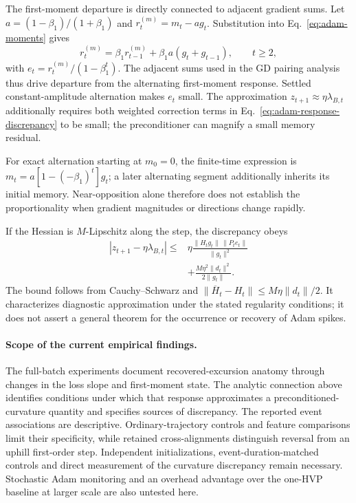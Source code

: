 The first-moment departure is directly connected to adjacent gradient
sums. Let $a=(1-\beta_1)/(1+\beta_1)$ and $r_t^{(m)}=m_t-ag_t$. Substitution
into Eq.~\eqref{eq:adam-moments} gives
\begin{equation}
r_t^{(m)}=\beta_1r_{t-1}^{(m)}+\beta_1a(g_t+g_{t-1}),
\qquad t\ge2,
\label{eq:adam-memory-residual}
\end{equation}
with $e_t=r_t^{(m)}/(1-\beta_1^t)$. The adjacent sums used in the GD pairing
analysis thus drive departure from the alternating first-moment response.
Settled constant-amplitude alternation makes $e_t$ small. The approximation
$z_{t+1}\approx\eta\lambda_{B,t}$ additionally requires both weighted
correction terms in Eq.~\eqref{eq:adam-response-discrepancy} to be small;
the preconditioner can magnify a small memory residual.

For exact alternation starting at $m_0=0$, the finite-time expression is
$m_t=a[1-(-\beta_1)^t]g_t$; a later alternating segment additionally
inherits its initial memory. Near-opposition alone therefore does not
establish the proportionality when gradient magnitudes or directions
change rapidly.

If the Hessian is $M$-Lipschitz along the step, the discrepancy obeys
\begin{equation}
\begin{aligned}
|z_{t+1}-\eta\lambda_{B,t}|
\leq{}&
\eta\frac{\|H_tg_t\|\,\|P_te_t\|}{\|g_t\|^2}\\
&+\frac{M\eta^2\|d_t\|^2}{2\|g_t\|}.
\end{aligned}
\label{eq:adam-response-error-bound}
\end{equation}
The bound follows from Cauchy--Schwarz and
$\|\overline H_t-H_t\|\leq M\eta\|d_t\|/2$.
It characterizes diagnostic approximation under the stated regularity
conditions; it does not assert a general theorem for the occurrence
or recovery of Adam spikes.

\paragraph{Scope of the current empirical findings.}
The full-batch experiments document recovered-excursion anatomy through
changes in the loss slope and first-moment state. The analytic connection
above identifies conditions under which that response approximates a
preconditioned-curvature quantity and specifies sources of discrepancy.
The reported event associations are descriptive. Ordinary-trajectory
controls and feature comparisons limit their specificity, while retained
cross-alignments distinguish reversal from an uphill first-order step.
Independent initializations, event-duration-matched controls and direct
measurement of the curvature discrepancy remain necessary. Stochastic
Adam monitoring and an overhead advantage over the one-HVP baseline
at larger scale are also untested here.
